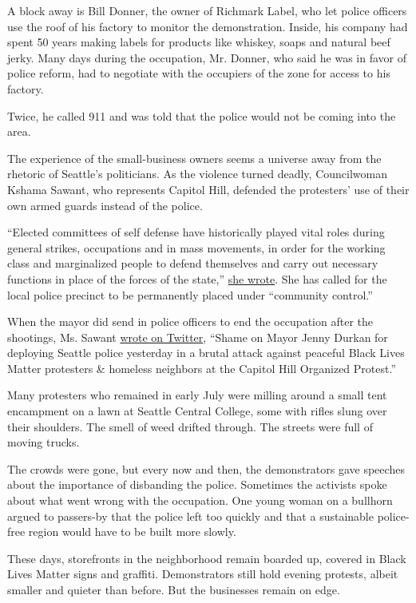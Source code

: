 A block away is Bill Donner, the owner of Richmark Label, who let police
officers use the roof of his factory to monitor the demonstration.
Inside, his company had spent 50 years making labels for products like
whiskey, soaps and natural beef jerky. Many days during the occupation,
Mr. Donner, who said he was in favor of police reform, had to negotiate
with the occupiers of the zone for access to his factory.

Twice, he called 911 and was told that the police would not be coming
into the area.

The experience of the small-business owners seems a universe away from
the rhetoric of Seattle's politicians. As the violence turned deadly,
Councilwoman Kshama Sawant, who represents Capitol Hill, defended the
protesters' use of their own armed guards instead of the police.

``Elected committees of self defense have historically played vital
roles during general strikes, occupations and in mass movements, in
order for the working class and marginalized people to defend themselves
and carry out necessary functions in place of the forces of the state,''
\href{https://council.seattle.gov/2020/06/20/statement-on-the-shooting-at-the-capitol-hill-organized-protest/}{she
wrote}. She has called for the local police precinct to be permanently
placed under ``community control.''

When the mayor did send in police officers to end the occupation after
the shootings, Ms. Sawant
\href{https://twitter.com/cmkshama/status/1278848527460757505?lang=en}{wrote
on Twitter}, ``Shame on Mayor Jenny Durkan for deploying Seattle police
yesterday in a brutal attack against peaceful Black Lives Matter
protesters \& homeless neighbors at the Capitol Hill Organized
Protest.''

Many protesters who remained in early July were milling around a small
tent encampment on a lawn at Seattle Central College, some with rifles
slung over their shoulders. The smell of weed drifted through. The
streets were full of moving trucks.

The crowds were gone, but every now and then, the demonstrators gave
speeches about the importance of disbanding the police. Sometimes the
activists spoke about what went wrong with the occupation. One young
woman on a bullhorn argued to passers-by that the police left too
quickly and that a sustainable police-free region would have to be built
more slowly.

These days, storefronts in the neighborhood remain boarded up, covered
in Black Lives Matter signs and graffiti. Demonstrators still hold
evening protests, albeit smaller and quieter than before. But the
businesses remain on edge.

